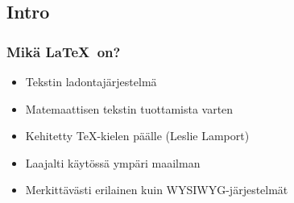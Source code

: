 
\subsection{Intro}
\begin{frame}
    \frametitle{Mikä \LaTeX\  on?}
    \begin{itemize}[<+->]
        \item Tekstin ladontajärjestelmä
        \item Matemaattisen tekstin tuottamista varten
        \item Kehitetty \TeX -kielen päälle (Leslie Lamport)
        \item Laajalti käytössä ympäri maailman
        \item Merkittävästi erilainen kuin WYSIWYG-järjestelmät
    \end{itemize}
\end{frame}
